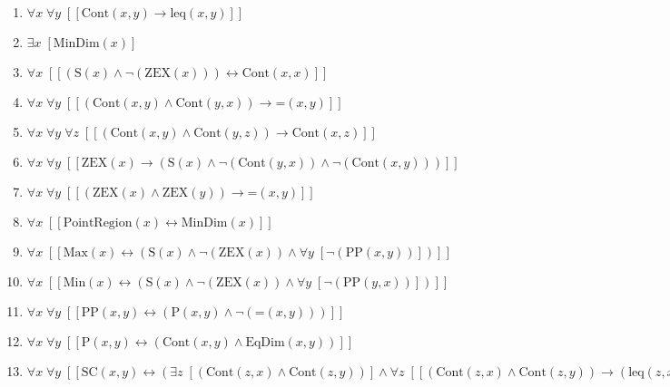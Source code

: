 \documentclass{article}
\begin{document}
\begin{enumerate}
\item $\forall x\; \forall y\;  \left[ \left[ \textrm{Cont}(x,y) \rightarrow \textrm{leq}(x,y) \right] \right]$
\item $\exists x\;  \left[ \textrm{MinDim}(x) \right]$
\item $\forall x\;  \left[ \left[ \left(\textrm{S}(x) \land \neg \left(\textrm{ZEX}(x)\right)\right) \leftrightarrow \textrm{Cont}(x,x) \right] \right]$
\item $\forall x\; \forall y\;  \left[ \left[ \left(\textrm{Cont}(x,y) \land \textrm{Cont}(y,x)\right) \rightarrow \textrm{=}(x,y) \right] \right]$
\item $\forall x\; \forall y\; \forall z\;  \left[ \left[ \left(\textrm{Cont}(x,y) \land \textrm{Cont}(y,z)\right) \rightarrow \textrm{Cont}(x,z) \right] \right]$
\item $\forall x\; \forall y\;  \left[ \left[ \textrm{ZEX}(x) \rightarrow \left(\textrm{S}(x) \land \neg \left(\textrm{Cont}(y,x)\right) \land \neg \left(\textrm{Cont}(x,y)\right)\right) \right] \right]$
\item $\forall x\; \forall y\;  \left[ \left[ \left(\textrm{ZEX}(x) \land \textrm{ZEX}(y)\right) \rightarrow \textrm{=}(x,y) \right] \right]$
\item $\forall x\;  \left[ \left[ \textrm{PointRegion}(x) \leftrightarrow \textrm{MinDim}(x) \right] \right]$
\item $\forall x\;  \left[ \left[ \textrm{Max}(x) \leftrightarrow \left(\textrm{S}(x) \land \neg \left(\textrm{ZEX}(x)\right) \land \forall y\;  \left[ \neg \left(\textrm{PP}(x,y)\right) \right]\right) \right] \right]$
\item $\forall x\;  \left[ \left[ \textrm{Min}(x) \leftrightarrow \left(\textrm{S}(x) \land \neg \left(\textrm{ZEX}(x)\right) \land \forall y\;  \left[ \neg \left(\textrm{PP}(y,x)\right) \right]\right) \right] \right]$
\item $\forall x\; \forall y\;  \left[ \left[ \textrm{PP}(x,y) \leftrightarrow \left(\textrm{P}(x,y) \land \neg \left(\textrm{=}(x,y)\right)\right) \right] \right]$
\item $\forall x\; \forall y\;  \left[ \left[ \textrm{P}(x,y) \leftrightarrow \left(\textrm{Cont}(x,y) \land \textrm{EqDim}(x,y)\right) \right] \right]$
\item $\forall x\; \forall y\;  \left[ \left[ \textrm{SC}(x,y) \leftrightarrow \left(\exists z\;  \left[ \left(\textrm{Cont}(z,x) \land \textrm{Cont}(z,y)\right) \right] \land \forall z\;  \left[ \left[ \left(\textrm{Cont}(z,x) \land \textrm{Cont}(z,y)\right) \rightarrow \left(\textrm{leq}(z,x) \land \neg \left(\textrm{EqDim}(z,x)\right) \land \textrm{leq}(z,y) \land \neg \left(\textrm{EqDim}(z,y)\right)\right) \right] \right]\right) \right] \right]$

\end{enumerate}
\end{document}

